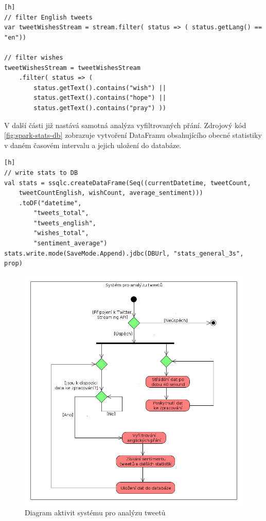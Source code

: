 \documentclass[thesis=B,czech]{FITthesis}[2012/06/26]
\begin{document}
\begin{lstlisting}[caption={Vyfiltrování anglických přání},label=fig:spark-filter][h]
// filter English tweets
var tweetWishesStream = stream.filter( status => ( status.getLang() == "en"))

// filter wishes
tweetWishesStream = tweetWishesStream
	.filter( status => (
		status.getText().contains("wish") ||
		status.getText().contains("hope") ||
		status.getText().contains("pray") ))
\end{lstlisting}


V další části již nastává samotná analýza vyfiltrovaných přání. Zdrojový kód \ref{fig:spark-stats-db} zobrazuje vytvoření DataFramu obsahujícího obecné statistiky v daném časovém intervalu a jejich uložení do databáze. 

\begin{lstlisting}[caption={Ukládání statistik do databáze},label=fig:spark-stats-db][h]
// write stats to DB
val stats = ssqlc.createDataFrame(Seq((currentDatetime, tweetCount,
	tweetCountEnglish, wishCount, average_sentiment)))
	.toDF("datetime",
		"tweets_total",
		"tweets_english",
		"wishes_total",
		"sentiment_average")
stats.write.mode(SaveMode.Append).jdbc(DBUrl, "stats_general_3s", prop)
\end{lstlisting}

	
\begin{figure}[h]
   	\centering
   	\includegraphics[width=1\textwidth]{images/activity-diagram.png}
   	\caption{Diagram aktivit systému pro analýzu tweetů}
   	\label{fig:activity_diagram}
\end{figure}
\end{document}
